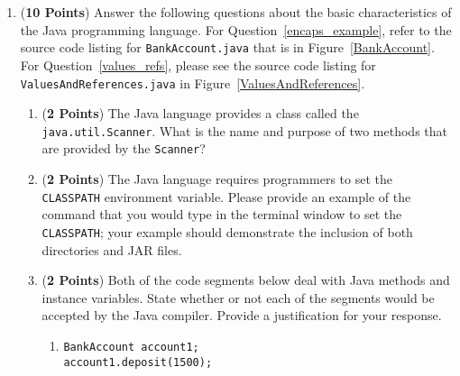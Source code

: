 \documentclass[12pt]{article}
\begin{document}
\begin{enumerate}
  
\item ({\bf 10 Points}) Answer the following questions about the basic characteristics of the Java programming language.
  For Question~\ref{encaps_example}, refer to the source code listing for {\tt BankAccount.java} that is in
  Figure~\ref{BankAccount}. For Question~\ref{values_refs}, please see the source code listing for {\tt
  ValuesAndReferences.java} in Figure~\ref{ValuesAndReferences}.

\begin{enumerate}


\item ({\bf 2 Points}) The Java language provides a class called the {\tt java.util.Scanner}.  What is the name and
  purpose of two methods that are provided by the {\tt Scanner}? 


\item ({\bf 2 Points}) The Java language requires programmers to set the {\tt CLASSPATH} environment variable.  Please
  provide an example of the command that you would type in the terminal window to set the {\tt CLASSPATH}; your example
  should demonstrate the inclusion of both directories and JAR files.


\item \label{encaps_example} ({\bf 2 Points}) Both of the code
segments below deal with Java methods and instance variables. State
whether or not each of the segments would be accepted by the Java
compiler.  Provide a justification for your response.

\begin{enumerate}

\item {\tt BankAccount account1;}\\
  {\tt account1.deposit(1500);} 


\end{enumerate}
\end{enumerate}
\end{enumerate}
\end{document}
